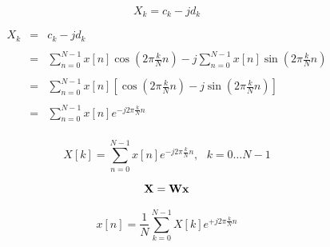 \documentclass{article}[12pt]
\newcommand{\Dfrac}[2]{\frac{\displaystyle #1}{\displaystyle #2}}
\newcommand{\D}{\displaystyle}
\begin{document}
$$X_k = c_k - j d_k$$

$$\begin{array}{lcl}
X_k & = & c_k - j d_k \\
&&\\
    & = & \D\sum_{n=0}^{N-1}x[n] \cos(2 \pi \Dfrac{k}{N} n) - j\D\sum_{n=0}^{N-1}x[n] \sin(2 \pi \Dfrac{k}{N} n) \\
&&\\
    & = & \D\sum_{n=0}^{N-1}x[n] \left [\cos(2 \pi \Dfrac{k}{N} n) - j\sin(2 \pi \Dfrac{k}{N} n) \right]\\
&&\\
    & = & \D\sum_{n=0}^{N-1}x[n] e^{-j 2 \pi \frac{k}{N} n}\\
\end{array}$$

$$X[k]= \sum_{n=0}^{N-1}x[n] e^{-j 2 \pi \frac{k}{N} n}, ~~~k =
0\ldots N-1 $$

$${\bf X} = {\bf W} {\bf x} $$ 

$$x[n] = \frac{1}{N} \sum_{k=0}^{N-1}X[k] e^{+j 2 \pi \frac{k}{N} n}$$
\end{document}
